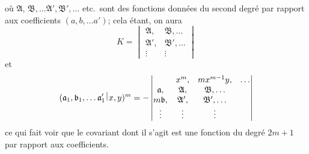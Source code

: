 \documentclass[11pt,a4paper]{book}
\theoremstyle{plain}
\newcommand{\wrule}{\hspace{-0.1em}\mid\hspace{-0.1em}}
\begin{document}
o\`{u} $\mathfrak{A}$, $\mathfrak{B},\ldots\mathfrak{A}',\mathfrak{B}',\ldots$ etc.\ sont des fonctions donn\'{e}es du second degr\'{e} par rapport aux coefficients $(a,b,\ldots a')$; cela \'{e}tant, on aura
\[
K=\begin{vmatrix}
\mathfrak{A}, & \mathfrak{B},\ldots\\
\mathfrak{A}', & \mathfrak{B}',\ldots\\
\vdots & \vdots
\end{vmatrix}
\]
et
\[
(\mathfrak{a}_1,\mathfrak{b}_1,\ldots\mathfrak{a}_1'\,\raisebox{0.5ex}{$\wrule$}\,x,y)^m
=-\begin{vmatrix}
\,\, & x^m, & m x^{m-1}y, & \ldots\\
\mathfrak{a}, & \mathfrak{A}, & \mathfrak{B},\ldots\\
m\mathfrak{b}, & \mathfrak{A}', & \mathfrak{B}',\ldots\\
\vdots & \vdots & \vdots
\end{vmatrix}
\]
ce qui fait voir que le covariant dont il s'agit est une fonction du degr\'{e} $2m+1$ par rapport aux coefficients.
\end{document}
